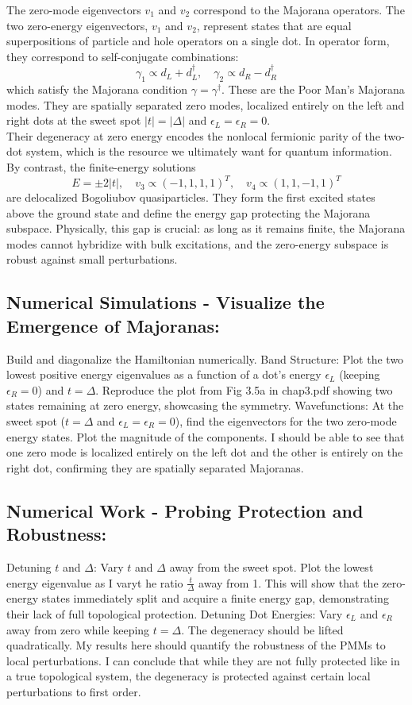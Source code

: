 \documentclass[11pt, letterpaper, titlepage]{article}
\begin{document}
The zero-mode eigenvectors $v_1$ and $v_2$ correspond to the Majorana operators. The two zero-energy eigenvectors,
$v_1$ and $v_2$, represent states that are equal superpositions of particle and hole operators on a single dot. In operator form, they correspond to self-conjugate combinations:
$$
γ_1 ∝ d_L + d_L^{†}, \quad γ_2 ∝ d_R - d_R^{†}
$$
which satisfy the Majorana condition $γ = γ^{†}$. These are the Poor Man's Majorana modes. They are spatially separated zero modes, localized entirely on the left and right dots at the sweet spot $|t| = |Δ|$ and $ϵ_L = ϵ_R = 0$.\\
Their degeneracy at zero energy encodes the nonlocal fermionic parity of the two-dot system, which is the resource we ultimately want for quantum information.\\ 
By contrast, the finite-energy solutions 
$$E = ±2|t|, \quad v_3 ∝ (-1, 1, 1, 1)^T, \quad v_4 ∝ (1, 1, -1, 1)^T$$
are delocalized Bogoliubov quasiparticles. They form the first excited states above the ground state and define the energy gap protecting the Majorana subspace. Physically, this gap is crucial: as long as it remains finite, the Majorana modes cannot hybridize with bulk excitations, and the zero-energy subspace is robust against small perturbations. 

\subsection{Numerical Simulations - Visualize the Emergence of Majoranas:} Build and diagonalize the Hamiltonian numerically. Band Structure: Plot the two lowest positive energy eigenvalues as a function of a dot's energy $ϵ_L$ (keeping $ϵ_R = 0$) and $t = Δ$. Reproduce the plot from Fig 3.5a in chap3.pdf showing two states remaining at zero energy, showcasing the symmetry. Wavefunctions: At the sweet spot ($t = Δ$ and $ϵ_L = ϵ_R = 0$), find the eigenvectors for the two zero-mode energy states. Plot the magnitude of the components. I should be able to see that one zero mode is localized entirely on the left dot and the other is entirely on the right dot, confirming they are spatially separated Majoranas.\\
\subsection{Numerical Work - Probing Protection and Robustness:} Detuning $t$ and $Δ$: Vary $t$ and $Δ$ away from the sweet spot. Plot the lowest energy eigenvalue as I varyt he ratio $\frac{t}{Δ}$ away from 1. This will show that the zero-energy states immediately split and acquire a finite energy gap, demonstrating their lack of full topological protection. Detuning Dot Energies: Vary $ϵ_L$ and $ϵ_R$ away from zero while keeping $t = Δ$. The degeneracy should be lifted quadratically. My results here should quantify the robustness of the PMMs to local perturbations. I can conclude that while they are not fully protected like in a true topological system, the degeneracy is protected against certain local perturbations to first order.\\
\end{document}
